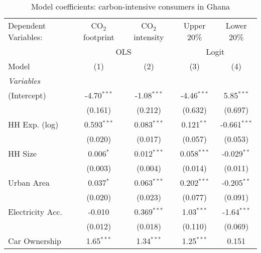 
\begin{table}[htbp!]
   \centering
   \small
   \begin{adjustbox}{width = 1\textwidth, max height = 0.95\textheight, center}
      \begin{threeparttable}[b]
         \caption{\label{tab:Logit_1_GHA} Model coefficients: carbon-intensive consumers in Ghana}
         \begin{tabular}{lcccc}
            \tabularnewline \midrule \midrule
            Dependent Variables: & CO$_{2}$ footprint & CO$_{2}$ intensity & Upper 20\%    & Lower 20\%\\   
             & \multicolumn{2}{c}{OLS} & \multicolumn{2}{c}{Logit} \\ 
            Model                & (1)                & (2)                & (3)           & (4)\\  
            \midrule
            \emph{Variables}\\
            (Intercept)          & -4.70$^{***}$      & -1.08$^{***}$      & -4.46$^{***}$ & 5.85$^{***}$\\   
                                 & (0.161)            & (0.212)            & (0.632)       & (0.697)\\   
            HH Exp. (log)        & 0.593$^{***}$      & 0.083$^{***}$      & 0.121$^{**}$  & -0.661$^{***}$\\   
                                 & (0.020)            & (0.017)            & (0.057)       & (0.053)\\   
            HH Size              & 0.006$^{*}$        & 0.012$^{***}$      & 0.058$^{***}$ & -0.029$^{**}$\\   
                                 & (0.003)            & (0.004)            & (0.014)       & (0.011)\\   
            Urban Area           & 0.037$^{*}$        & 0.063$^{***}$      & 0.202$^{***}$ & -0.205$^{**}$\\   
                                 & (0.020)            & (0.023)            & (0.077)       & (0.091)\\   
            Electricity Acc.     & -0.010             & 0.369$^{***}$      & 1.03$^{***}$  & -1.64$^{***}$\\   
                                 & (0.012)            & (0.018)            & (0.110)       & (0.069)\\   
            Car Ownership        & 1.65$^{***}$       & 1.34$^{***}$       & 1.25$^{***}$  & 0.151\\   

\end{tabular}
\end{threeparttable}
\end{adjustbox}
\end{table}
